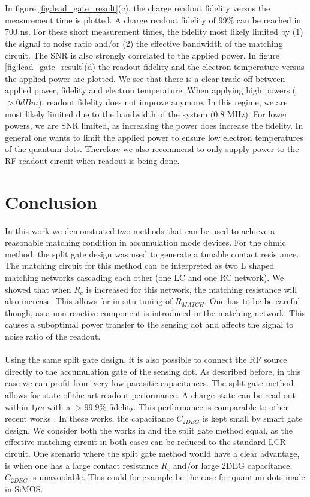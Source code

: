 \documentclass{article}
\begin{document}
	\\ \\
	In figure \ref{fig:lead_gate_result}(c), the charge readout fidelity versus the measurement time is plotted. A charge readout fidelity of 99\% can be reached in 700 ns. For these short measurement times, the fidelity most likely limited by (1) the signal to noise ratio and/or (2) the effective bandwidth of the matching circuit. The SNR is also strongly correlated to the applied power. In figure \ref{fig:lead_gate_result}(d) the readout fidelity and the electron temperature versus the applied power are plotted. We see that there is a clear trade off between applied power, fidelity and electron temperature.  
	When applying high powers ($>0dBm$), readout fidelity does not improve anymore. In this regime, we are most likely limited due to the bandwidth of the system (0.8 MHz). For lower powers, we are SNR limited, as increasing the power does increase the fidelity. In general one wants to limit the applied power to ensure low electron temperatures of the quantum dots. Therefore we also recommend to only supply power to the RF readout circuit when readout is being done. 

\section{Conclusion}
In this work we demonstrated two methods that can be used to achieve a reasonable matching condition in accumulation mode devices. For the ohmic method, the split gate design was used to generate a tunable contact resistance. The matching circuit for this method can be interpreted as two L shaped matching networks cascading each other (one LC and one RC network). We showed that when $R_c$ is increased for this network, the matching resistance will also increase. This allows for in situ tuning of $R_{MATCH}$. One has to be be careful though, as a non-reactive component is introduced in the matching network. This causes a suboptimal power transfer to the sensing dot and affects the signal to noise ratio of the readout. \\ \\
Using the same split gate design, it is also possible to connect the RF source directly to the accumulation gate of the sensing dot. As described before, in this case we can profit from very low parasitic capacitances. The split gate method allows for state of the art readout performance. A charge state can be read out within $1\mu s$ with a $>$99.9\% fidelity. This performance is comparable to other recent works \cite{Connors2020,noiri2020radio}. In these works, the capacitance $C_{2DEG}$ is kept small by smart gate design. We consider both the works in \cite{Connors2020,noiri2020radio} and the split gate method equal, as the effective matching circuit in both cases can be reduced to the standard LCR circuit. One scenario where the split gate method would have a clear advantage, is when one has a large contact resistance $R_c$ and/or large 2DEG capacitance, $C_{2DEG}$ is unavoidable. This could for example be the case for quantum dots made in SiMOS.
\\
\\
\end{document}
